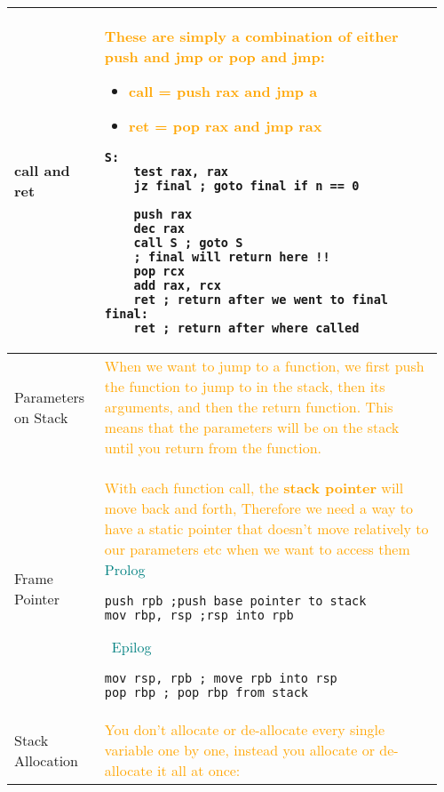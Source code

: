 \documentclass[main.tex,fontsize=8pt,paper=a4,paper=portrait,DIV=calc,]{scrartcl}
\begin{document}
\pagebreak
\begin{table}[ht!]
\begin{tabular}{|m{0.2\linewidth}|m{0.755\linewidth}|}
\hline
call and ret & 
\textcolor{orange}{These are simply a combination of either push and jmp or pop and jmp:}\newline
\begin{itemize}
\item \textcolor{orange}{call = push rax and jmp a}
\item \textcolor{orange}{ret = pop rax and jmp rax}
\vspace{-2mm}
\end{itemize} 
\begin{lstlisting}
S: 
    test rax, rax
    jz final ; goto final if n == 0

    push rax
    dec rax
    call S ; goto S
    ; final will return here !!
    pop rcx 
    add rax, rcx
    ret ; return after we went to final 
final:
    ret ; return after where called
\end{lstlisting}\\
\hline
Parameters on Stack & 
\textcolor{orange}{When we want to jump to a function, we first push the function to jump to in the stack, then its arguments, and then the return function.\newline
This means that the parameters will be on the stack until you return from the function.}\\
\hline
Frame Pointer & 
\textcolor{orange}{With each function call, the \textbf{stack pointer} will move back and forth,\newline
Therefore we need a way to have a static pointer that doesn't move relatively to our parameters etc when we want to access them}\newline
\textcolor{teal}{Prolog}\newline
\begin{lstlisting}
push rpb ;push base pointer to stack
mov rbp, rsp ;rsp into rpb
\end{lstlisting} 
\, \newline
\textcolor{teal}{Epilog}\newline
\begin{lstlisting}
mov rsp, rpb ; move rpb into rsp 
pop rbp ; pop rbp from stack
\end{lstlisting}\\
\hline
Stack Allocation& 
\textcolor{orange}{You don't allocate or de-allocate every single variable one by one, instead you allocate or de-allocate it all at once:}\newline

\end{tabular}
\end{table}
\end{document}
